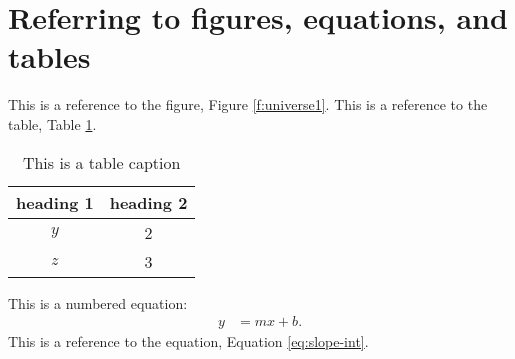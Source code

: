 
\section{Referring to figures, equations, and tables}


This is a reference to the figure, Figure \ref{f:universe1}.
This is a reference to the table, Table \ref{t:table-a}. 

\begin{table}[H]
\centering
\begin{tabular}{c|c}
heading 1 & heading 2 \\ \hline
$y$ & 2\\ 
$z$ & 3
\end{tabular}
\caption{This is a table caption}
\label{t:table-a}
\end{table}

This is a numbered equation: 
\begin{align}\label{eq:slope-int}
y &= m x+b.
\end{align}
This is a reference to the equation, 
Equation \ref{eq:slope-int}. 